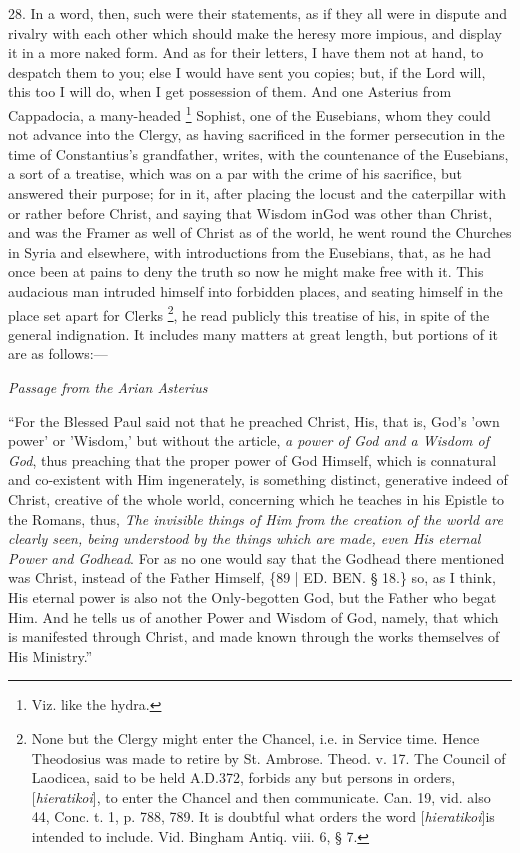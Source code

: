 28. In a word, then, such were
their statements, as if they all were in dispute and rivalry with each
other which should make the heresy more impious, and display it in a
more naked form. And as for their letters, I have them not at hand, to
despatch them to you; else I would have sent you copies; but, if the
Lord will, this too I will do, when I get possession of them. And one
Asterius from Cappadocia, a many-headed \footnote{Viz. like the hydra.} Sophist, one of the Eusebians, whom they could not advance
into the Clergy, as having sacrificed in the former persecution in the
time of Constantius's grandfather, writes, with the countenance
of the Eusebians, a sort of a treatise, which was on a par with the
crime of his sacrifice, but answered their purpose; for in it, after
placing the locust and the caterpillar with or rather before Christ,
and saying that Wisdom in\emph{}God was other than Christ, and was
the Framer as well of Christ as of the world, he went round the
Churches in Syria and elsewhere, with introductions from the Eusebians,
that, as he had once been at pains to deny the truth so now he might
make free with it. This audacious man intruded himself into forbidden
places, and seating himself in the place set apart for Clerks \footnote{None but the Clergy might enter the Chancel, i.e. in Service time.
Hence Theodosius was made to retire by St. Ambrose. Theod. v. 17. The
Council of Laodicea, said to be held A.D.\emph{}372, forbids any but persons in orders, [\emph{hieratikoi}], to
enter the Chancel and then communicate. Can. 19, vid. also 44, Conc.
t. 1, p. 788, 789. It is doubtful what orders the word [\emph{hieratikoi}]\emph{}is intended to include. Vid. Bingham Antiq. viii. 6, § 7.}, he read publicly this treatise of his, in spite of the
general indignation. It includes many matters at great length, but
portions of it are as follows:—

\emph{Passage from
the Arian Asterius}

``For the Blessed Paul said not
that he preached Christ, His, that is, God's 'own power' or 'Wisdom,'
but without the article, \emph{a power of God and a Wisdom of God},
thus preaching that the proper power of God Himself, which is
connatural and co-existent with Him ingenerately, is something
distinct, generative indeed of Christ, creative of the whole world,
concerning which he teaches in his Epistle to the Romans, thus, \emph{The
invisible things of Him from the creation of the world are clearly
seen, being understood by the things which are made, even His eternal
Power and Godhead}. For as no one would say that the Godhead there
mentioned was Christ, instead of the Father Himself, \{89 | ED.
BEN.
§ 18.\} so, as I think, His eternal power is also not the
Only-begotten God, but the Father who begat Him. And he tells us of
another Power and Wisdom of God, namely, that which is manifested
through Christ, and made known through the works themselves of His
Ministry.''

